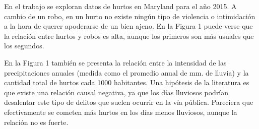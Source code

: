 \documentclass[10.5pt]{article}   %
\begin{document}
En el trabajo se exploran datos de hurtos en Maryland para el año 2015. A cambio de un robo, en un hurto no existe ningún tipo de violencia o intimidación a la hora de querer apoderarse de un bien ajeno. En la Figura 1 puede verse que la relación entre hurtos y robos es alta, aunque los primeros son más usuales que los segundos.


En la Figura 1 también se presenta la relación entre la intensidad de las precipitaciones anuales (medida como el promedio anual de mm. de lluvia) y la cantidad total de hurtos cada 1000 habitantes. Una hipótesis de la literatura es que existe una relación causal negativa, ya que los días lluviosos podrían desalentar este tipo de delitos que suelen ocurrir en la vía pública. Pareciera que efectivamente se cometen más hurtos en los días menos lluviosos, aunque la relación no es fuerte. %
\end{document}
